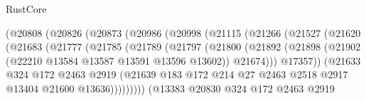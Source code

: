 \begin{lexlean}{RustCore}
\begin{coremodule}
                        (@20808
                          (@20826
                            (@20873
                              (@20986
                                (@20998
                                  (@21115
                                    (@21266
                                      (@21527
                                        (@21620
                                          (@21683
                                            (@21777
                                              (@21785
                                                (@21789
                                                  (@21797
                                                    (@21800
                                                      (@21892
                                                        (@21898
                                                          (@21902
                                                            (@22210
                                                              @13584
                                                              @13587
                                                              @13591
                                                              @13596
                                                              @13602))
                                                          @21674)))
                                                    @17357))
                                                (@21633
                                                  @324
                                                  @172
                                                  @2463
                                                  @2919
                                                  (@21639
                                                    @183
                                                    @172
                                                    @214
                                                    @27
                                                    @2463
                                                    @2518
                                                    @2917
                                                    @13404
                                                    @21600
                                                    @13636)))))))))
                                  (@13383
                                    @20830
                                    @324
                                    @172
                                    @2463
                                    @2919

\end{coremodule}
\end{lexlean}
